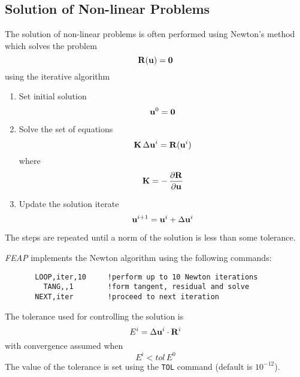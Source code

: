 \subsection{Solution of Non-linear Problems}
\label{nonlin}

The solution of non-linear problems is often performed using Newton's
method which solves the problem
\begin{equation}
\mathbf{R}(\mathbf{u}) = \mathbf{0}
\end{equation}
using the iterative algorithm

\begin{enumerate}
\item Set initial solution
\begin{equation}
\mathbf{u}^0 = \mathbf{0}
\end{equation}
\item Solve the set of equations
\begin{equation}
\mathbf{K} \, \Delta\mathbf{u}^i = \mathbf{R}(\mathbf{u}^i)
\end{equation}
where
\begin{equation}
\mathbf{K} = - \, \frac{\partial \mathbf{R}}{\partial \mathbf{u}}
\end{equation}
\item
Update the solution iterate
\begin{equation}
\mathbf{u}^{i+1} = \mathbf{u}^i + \Delta\mathbf{u}^i
\end{equation}
\end{enumerate}
The steps are repeated until a norm of the solution is less than some tolerance.

{\sl FEAP} implements the Newton algorithm using the
following commands:
\begin{verbatim}
       LOOP,iter,10     !perform up to 10 Newton iterations
         TANG,,1        !form tangent, residual and solve
       NEXT,iter        !proceed to next iteration
\end{verbatim}
The tolerance used for controlling the solution is
\begin{equation}
E^i = \Delta{\mathbf{u}^i} \cdot \mathbf{R}^i
\end{equation}
with convergence assumed when
\begin{equation}
E^i < tol \, E^0
\end{equation}
The value of the tolerance is set using the {\tt TOL} command (default
is $10^{-12}$).

